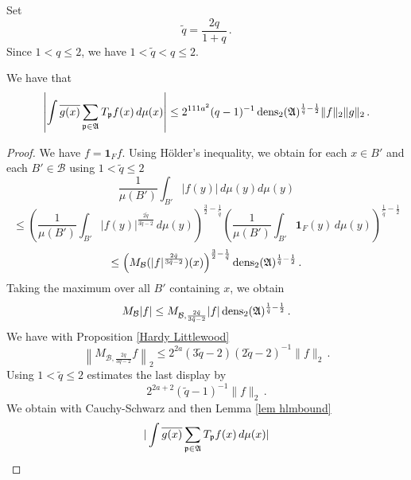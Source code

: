 {Set
\begin{equation}
    \tilde{q}=\frac {2q}{1+q}\,.
\end{equation}
Since $1< q\le 2$, we have $1<\tilde{q}<q\le 2$.
\begin{lemma}
\label{lem decay t}
We have that
\begin{equation}\label{eqttt9}
  \left|\int \overline{g(x)} \sum_{\mathfrak p \in \mathfrak{A}} T_{\mathfrak p} f(x)\, d\mu(x)\right|\le
  2^{111a^2}({q}-1)^{-1} \operatorname{\operatorname{dens}}_2(\mathfrak{A})^{\frac 1{\tilde{q}}-\frac 12} \|f\|_2\|g\|_2\, .
\end{equation}
\end{lemma}
\begin{proof}
We have $f=\mathbf{1}_Ff$. Using H\"older's inequality, we obtain for
each $x\in B'$ and each $B'\in \mathcal{B}$ using $1<\tilde{q}\le 2$
\begin{equation}
    \frac 1{\mu(B')}\int_{B'} |f(y)|\, d\mu(y)d\mu(y)
\end{equation}
\begin{equation}
    \le
    \left(\frac 1{\mu(B')}\int_{B'} |f(y)|^{\frac {2{\tilde{q}}}{3\tilde{q}-2}}\, d\mu(y)\right)^{\frac 32-\frac 1{\tilde{q}}}
    \left(\frac 1{\mu(B')}\int_{B'} \mathbf{1}_F(y)\, d\mu(y)\right)^{\frac 1{\tilde{q}}-\frac 12}
\end{equation}
\begin{equation}
    \le \left(M_{\mathcal{B}} (|f|^{\frac {2{\tilde{q}}}{3{\tilde{q}}-2}})(x)\right)^{\frac 32-\frac 1{\tilde{q}}}
\operatorname{\operatorname{dens}}_2(\mathfrak{A})^{\frac 1{\tilde{q}}-\frac 12}\, .
\end{equation}
Taking the maximum over all $B'$ containing $x$, we obtain
\begin{equation} \label{eqttt1}
    M_{\mathcal{B}}|f|\le
    M_{\mathcal{B},\frac {2{\tilde{q}}}{3{\tilde{q}}-2} } |f|
    \operatorname{\operatorname{dens}}_2(\mathfrak{A})^{\frac 1{\tilde{q}}-\frac 12}\, .
\end{equation}
We have with Proposition \ref{Hardy Littlewood}
\begin{equation}
\left\|M_{\mathcal{B}, \frac {2q}{3q-2}} f\right\|_2\le 2^{2a}(3\tilde{q}-2)(2\tilde{q}-2)^{-1}\|f\|_2\, .
\end{equation}
Using $1<\tilde{q}\le 2$ estimates the last display by
\begin{equation}\label{eqttt2}
 2^{2a+2} (\tilde{q}-1)^{-1}  \|f\|_2\, .
\end{equation}
We obtain with Cauchy-Schwarz
and then Lemma \ref{lem hlmbound}
 \begin{equation}
     |\int \overline{g(x)} \sum_{\fp \in \mathfrak{A}} T_{\fp} f(x)\, d\mu(x)|

\end{equation}
\end{proof}}
